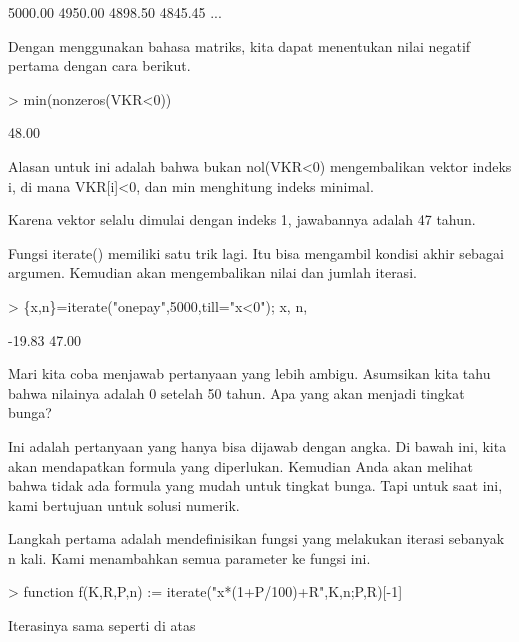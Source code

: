 \documentclass[a4paper,10pt]{article}
\begin{document}
\begin{eulernotebook}
\begin{eulercomment}
\begin{eulercomment}
\begin{eulercomment}
\begin{eulercomment}
\begin{eulercomment}
\begin{eulercomment}
\begin{eulercomment}
\begin{eulercomment}
\begin{eulercomment}
\begin{eulercomment}
\begin{eulercomment}
\begin{eulercomment}
\begin{euleroutput}
      5000.00     4950.00     4898.50     4845.45     ...
\end{euleroutput}
\begin{eulercomment}
Dengan menggunakan bahasa matriks, kita dapat menentukan nilai negatif
pertama dengan cara berikut.
\end{eulercomment}
\begin{eulerprompt}
> min(nonzeros(VKR<0))
\end{eulerprompt}
\begin{euleroutput}
        48.00 
\end{euleroutput}
\begin{eulercomment}
Alasan untuk ini adalah bahwa bukan nol(VKR\textless{}0) mengembalikan vektor
indeks i, di mana VKR[i]\textless{}0, dan min menghitung indeks minimal.

Karena vektor selalu dimulai dengan indeks 1, jawabannya adalah 47
tahun.

Fungsi iterate() memiliki satu trik lagi. Itu bisa mengambil kondisi
akhir sebagai argumen. Kemudian akan mengembalikan nilai dan jumlah
iterasi.
\end{eulercomment}
\begin{eulerprompt}
> \{x,n\}=iterate("onepay",5000,till="x<0"); x, n,
\end{eulerprompt}
\begin{euleroutput}
       -19.83 
        47.00 
\end{euleroutput}
\begin{eulercomment}
Mari kita coba menjawab pertanyaan yang lebih ambigu. Asumsikan kita
tahu bahwa nilainya adalah 0 setelah 50 tahun. Apa yang akan menjadi
tingkat bunga?

Ini adalah pertanyaan yang hanya bisa dijawab dengan angka. Di bawah
ini, kita akan mendapatkan formula yang diperlukan. Kemudian Anda akan
melihat bahwa tidak ada formula yang mudah untuk tingkat bunga. Tapi
untuk saat ini, kami bertujuan untuk solusi numerik.

Langkah pertama adalah mendefinisikan fungsi yang melakukan iterasi
sebanyak n kali. Kami menambahkan semua parameter ke fungsi ini.
\end{eulercomment}
\begin{eulerprompt}
> function f(K,R,P,n) := iterate("x*(1+P/100)+R",K,n;P,R)[-1]
\end{eulerprompt}
\begin{eulercomment}
Iterasinya sama seperti di atas


\end{eulercomment}
\end{eulercomment}
\end{eulercomment}
\end{eulercomment}
\end{eulercomment}
\end{eulercomment}
\end{eulercomment}
\end{eulercomment}
\end{eulercomment}
\end{eulercomment}
\end{eulercomment}
\end{eulercomment}
\end{eulercomment}
\end{eulernotebook}
\end{document}
